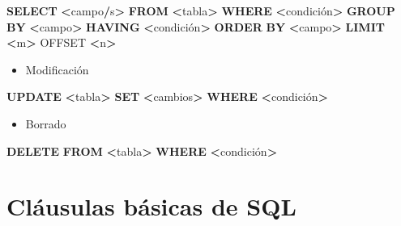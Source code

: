 \documentclass[
]{book}
\newenvironment{Shaded}{\begin{snugshade}}{\end{snugshade}}
\newcommand{\KeywordTok}[1]{\textcolor[rgb]{0.13,0.29,0.53}{\textbf{#1}}}
\newcommand{\NormalTok}[1]{#1}
\newcommand{\OperatorTok}[1]{\textcolor[rgb]{0.81,0.36,0.00}{\textbf{#1}}}
\providecommand{\tightlist}{%
  \setlength{\itemsep}{0pt}\setlength{\parskip}{0pt}}
\theoremstyle{break}
\theoremstyle{nonumberplain}
\begin{document}
\begin{Shaded}
\begin{Highlighting}[]
  \KeywordTok{SELECT} \OperatorTok{\textless{}}\NormalTok{campo}\OperatorTok{/}\NormalTok{s}\OperatorTok{\textgreater{}}
  \KeywordTok{FROM} \OperatorTok{\textless{}}\NormalTok{tabla}\OperatorTok{\textgreater{}}
  \KeywordTok{WHERE} \OperatorTok{\textless{}}\NormalTok{condición}\OperatorTok{\textgreater{}}
  \KeywordTok{GROUP} \KeywordTok{BY} \OperatorTok{\textless{}}\NormalTok{campo}\OperatorTok{\textgreater{}}
  \KeywordTok{HAVING} \OperatorTok{\textless{}}\NormalTok{condición}\OperatorTok{\textgreater{}}
  \KeywordTok{ORDER} \KeywordTok{BY} \OperatorTok{\textless{}}\NormalTok{campo}\OperatorTok{\textgreater{}}
  \KeywordTok{LIMIT} \OperatorTok{\textless{}}\NormalTok{m}\OperatorTok{\textgreater{}}\NormalTok{ OFFSET }\OperatorTok{\textless{}}\NormalTok{n}\OperatorTok{\textgreater{}}
\end{Highlighting}
\end{Shaded}

\begin{itemize}
\tightlist
\item
  Modificación
\end{itemize}

\begin{Shaded}
\begin{Highlighting}[]
  \KeywordTok{UPDATE} \OperatorTok{\textless{}}\NormalTok{tabla}\OperatorTok{\textgreater{}}
  \KeywordTok{SET} \OperatorTok{\textless{}}\NormalTok{cambios}\OperatorTok{\textgreater{}}
  \KeywordTok{WHERE} \OperatorTok{\textless{}}\NormalTok{condición}\OperatorTok{\textgreater{}}
\end{Highlighting}
\end{Shaded}

\begin{itemize}
\tightlist
\item
  Borrado
\end{itemize}

\begin{Shaded}
\begin{Highlighting}[]
  \KeywordTok{DELETE} \KeywordTok{FROM} \OperatorTok{\textless{}}\NormalTok{tabla}\OperatorTok{\textgreater{}}
  \KeywordTok{WHERE} \OperatorTok{\textless{}}\NormalTok{condición}\OperatorTok{\textgreater{}}
\end{Highlighting}
\end{Shaded}

\section{Cláusulas básicas de SQL}\label{cluxe1usulas-buxe1sicas-de-sql}
\end{document}
